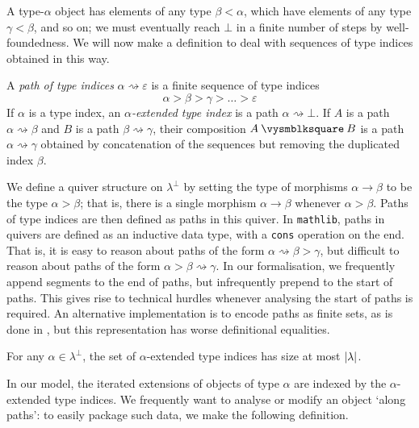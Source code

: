 A type-\( \alpha \) object has elements of any type \( \beta < \alpha \), which have elements of any type \( \gamma < \beta \), and so on; we must eventually reach \( \bot \) in a finite number of steps by well-foundedness.
We will now make a definition to deal with sequences of type indices obtained in this way.
\begin{definition}
    A \emph{path of type indices} \( \alpha \rightsquigarrow \varepsilon \) is a finite sequence of type indices
    \[ \alpha > \beta > \gamma > \dots > \varepsilon \]
    If \( \alpha \) is a type index, an \emph{\( \alpha \)-extended type index} is a path \( \alpha \rightsquigarrow \bot \).
    If \( A \) is a path \( \alpha \rightsquigarrow \beta \) and \( B \) is a path \( \beta \rightsquigarrow \gamma \), their composition \( A \pcomp B \) is a path \( \alpha \rightsquigarrow \gamma \) obtained by concatenation of the sequences but removing the duplicated index \( \beta \).
\end{definition}
\begin{detail}
    We define a quiver structure on \( \lambda^\bot \) by setting the type of morphisms \( \alpha \to \beta \) to be the type \( \alpha > \beta \); that is, there is a single morphism \( \alpha \to \beta \) whenever \( \alpha > \beta \).
    Paths of type indices are then defined as paths in this quiver.
    In \texttt{mathlib}, paths in quivers are defined as an inductive data type, with a \texttt{cons} operation on the end.
    That is, it is easy to reason about paths of the form \( \alpha \rightsquigarrow \beta > \gamma \), but difficult to reason about paths of the form \( \alpha > \beta \rightsquigarrow \gamma \).
    In our formalisation, we frequently append segments to the end of paths, but infrequently prepend to the start of paths.
    This gives rise to technical hurdles whenever analysing the start of paths is required.
    An alternative implementation is to encode paths as finite sets, as is done in \cite{con-nf}, but this representation has worse definitional equalities.
\end{detail}
\begin{remark}
    For any \( \alpha \in \lambda^\bot \), the set of \( \alpha \)-extended type indices has size at most \( \left|\lambda\right| \).
\end{remark}
In our model, the iterated extensions of objects of type \( \alpha \) are indexed by the \( \alpha \)-extended type indices.
We frequently want to analyse or modify an object `along paths': to easily package such data, we make the following definition.
